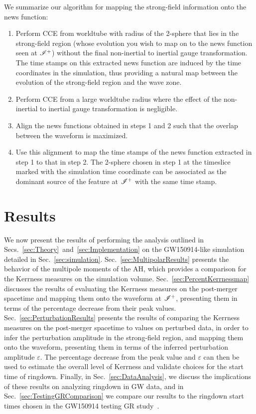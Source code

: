 We summarize our algorithm for mapping the strong-field information onto the news function: 
\begin{enumerate}
\item Perform CCE from worldtube with radius of the 2-sphere that lies in the strong-field region (whose evolution you wish to map on to the news function seen at $\mathscr{I^+}$) without the final non-inertial to inertial gauge transformation. The time stamps on this extracted news function are induced by the time coordinates in the simulation, thus providing a natural map between the evolution of the strong-field region and the wave zone.
\item Perform CCE from a large worldtube radius where the effect of the non-inertial to inertial gauge transformation is negligible. 
\item Align the news functions obtained in steps 1 and 2 such that the overlap between the waveform is maximized. 
\item Use this alignment to map the time stamps of the news function extracted in step 1 to that in step 2. The 2-sphere chosen in step 1 at the timeslice marked with the simulation time coordinate can be associated as the dominant source of the feature at $\mathscr{I^+}$ with the same time stamp. 
\end{enumerate}


\section{Results}
\label{sec:ResultMain}

We now present the results of performing the analysis outlined in Secs.~\ref{sec:Theory}~and~\ref{sec:Implementation} on the GW150914-like simulation detailed in Sec.~\ref{sec:simulation}. Sec.~\ref{sec:MultipolarResults} presents the behavior of the multipole moments of the AH, which provides a comparison for the Kerrness measures on the simulation volume. Sec.~\ref{sec:PercentKerrnessmap} discusses the results of evaluating the Kerrness measures on the post-merger spacetime and mapping them onto the waveform at $\mathscr{I^+}$, presenting them in terms of the percentage decrease from their peak values. Sec.~\ref{sec:PerturbationResults} presents the results of comparing the Kerrness measures on the post-merger spacetime to values on perturbed data, in order to infer the perturbation amplitude in the strong-field region, and mapping them onto the waveform, presenting them in terms of the inferred perturbation amplitude $\varepsilon$. The percentage decrease from the peak value and $\varepsilon$ can then be used to estimate the overall level of Kerrness and validate choices for the start time of ringdown. Finally, in Sec.~\ref{sec:DataAnalysis}, we discuss the implications of these results on analyzing ringdown in GW data, and in Sec.~\ref{sec:TestingGRComparison} we compare our results to the ringdown start times chosen in the GW150914 testing GR study~\cite{TheLIGOScientific:2016src}. 


